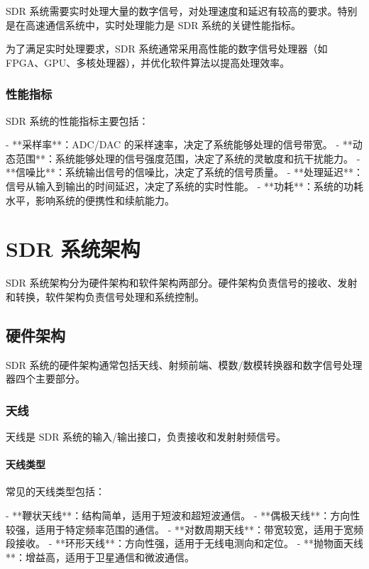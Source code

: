 \documentclass[UTF8]{ctexbook}
\begin{document}
SDR 系统需要实时处理大量的数字信号，对处理速度和延迟有较高的要求。特别是在高速通信系统中，实时处理能力是 SDR 系统的关键性能指标。

为了满足实时处理要求，SDR 系统通常采用高性能的数字信号处理器（如 FPGA、GPU、多核处理器），并优化软件算法以提高处理效率。

\subsection{性能指标}

SDR 系统的性能指标主要包括：

- **采样率**：ADC/DAC 的采样速率，决定了系统能够处理的信号带宽。
- **动态范围**：系统能够处理的信号强度范围，决定了系统的灵敏度和抗干扰能力。
- **信噪比**：系统输出信号的信噪比，决定了系统的信号质量。
- **处理延迟**：信号从输入到输出的时间延迟，决定了系统的实时性能。
- **功耗**：系统的功耗水平，影响系统的便携性和续航能力。

\chapter{SDR 系统架构}

SDR 系统架构分为硬件架构和软件架构两部分。硬件架构负责信号的接收、发射和转换，软件架构负责信号处理和系统控制。

\section{硬件架构}

SDR 系统的硬件架构通常包括天线、射频前端、模数/数模转换器和数字信号处理器四个主要部分。

\subsection{天线}

天线是 SDR 系统的输入/输出接口，负责接收和发射射频信号。

\subsubsection{天线类型}

常见的天线类型包括：

- **鞭状天线**：结构简单，适用于短波和超短波通信。
- **偶极天线**：方向性较强，适用于特定频率范围的通信。
- **对数周期天线**：带宽较宽，适用于宽频段接收。
- **环形天线**：方向性强，适用于无线电测向和定位。
- **抛物面天线**：增益高，适用于卫星通信和微波通信。
\end{document}
